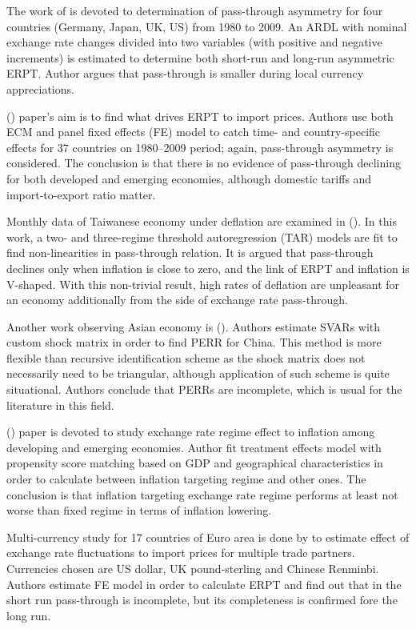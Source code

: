 \documentclass[12pt, a4paper]{extarticle}
\begin{document}
The work of \textcite{Delatte2012} is devoted to determination of pass-through asymmetry for four countries (Germany, Japan, UK, US) from 1980 to 2009. An ARDL with nominal exchange rate changes divided into two variables (with positive and negative increments) is estimated to determine both short-run and long-run asymmetric ERPT. Author argues that pass-through is smaller during local currency appreciations.

(\cite{BrunAguerre2012}) paper's aim is to find what drives ERPT to import prices. Authors use both ECM and panel fixed effects (FE) model to catch time- and country-specific effects for 37 countries on 1980--2009 period; again, pass-through asymmetry is considered. The conclusion is that there is no evidence of pass-through declining for both developed and emerging economies, although domestic tariffs and import-to-export ratio matter.

Monthly data of Taiwanese economy under deflation are examined in (\cite{Lin2012}). In this work, a two- and three-regime threshold autoregression (TAR) models are fit to find non-linearities in pass-through relation. It is argued that pass-through declines only when inflation is close to zero, and the link of ERPT and inflation is V-shaped. With this non-trivial result, high rates of deflation are unpleasant for an economy additionally from the side of exchange rate pass-through.

Another work observing Asian economy is (\cite{Jiang2013}). Authors estimate SVARs with custom shock matrix in order to find PERR for China. This method is more flexible than recursive identification scheme as the shock matrix does not necessarily need to be triangular, although application of such scheme is quite situational. Authors conclude that PERRs are incomplete, which is usual for the literature in this field.

(\cite{Yamada2013}) paper is devoted to study exchange rate regime effect to inflation among developing and emerging economies. Author fit treatment effects model with propensity score matching based on GDP and geographical characteristics in order to calculate between inflation targeting regime and other ones. The conclusion is that inflation targeting exchange rate regime performs at least not worse than fixed regime in terms of inflation lowering.

Multi-currency study for 17 countries of Euro area is done by \textcite{Bandt2014} to estimate effect of exchange rate fluctuations to import prices for multiple trade partners. Currencies chosen are US dollar, UK pound-sterling and Chinese Renminbi. Authors estimate FE model in order to calculate ERPT and find out that in the short run pass-through is incomplete, but its completeness is confirmed fore the long run.
\end{document}
